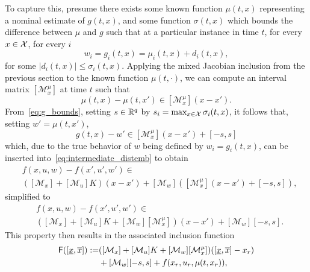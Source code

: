 \documentclass{IEEEojcsys}
\begin{document}
To capture this, presume there exists some known function $\mu(t, x)$ representing a nominal estimate of $g(t, x)$, and some function $\sigma(t, x)$ which bounds the difference between $\mu$ and $g$ such that at a particular instance in time $t$, for every $x\in \mathcal{X}$, for every $i$
\begin{equation}
    w_i = g_i(t,x) = \mu_i(t,x) + d_i(t,x),
    \label{eq:g_bounds}
\end{equation}
for some $|d_i(t,x)| \leq \sigma_i(t,x)$.
Applying the mixed Jacobian inclusion from the previous section to the known function $\mu(t,\cdot)$, we can compute an interval matrix $[\mathcal{M}_x^\mu]$ at time $t$ such that
\begin{equation}
    \mu(t, x) - \mu(t, x') \in [\mathcal{M}_x^\mu](x - x').
\end{equation}
From~\eqref{eq:g_bounds}, setting $s\in\mathbb{R}^q$ by $s_i = \max_{x\in\mathcal{X}} \sigma_i(t,x)$, it follows that, setting $w' = \mu(t,x')$,
\begin{equation}
    g(t, x) - w' \in [\mathcal{M}_x^\mu](x - x') + [-s,s]  %
\end{equation}
which, due to the true behavior of $w$ being defined by $w_i = g_i(t, x)$, can be inserted into~\eqref{eq:intermediate_distemb} to obtain
\begin{align}
    &f(x, u, w) - f(x', u', w') \in \label{eq:almost_final_algeb}\\ &([\mathcal{M}_x] + [\mathcal{M}_u]K)(x - x') + [\mathcal{M}_w]([\mathcal{M}^\mu_x](x - x') + [-s,s]), \nonumber
\end{align}
simplified to
\begin{align}
    &f(x, u, w) - f(x', u', w') \in \label{eq:final_algeb}\\ &([\mathcal{M}_x] + [\mathcal{M}_u]K + [\mathcal{M}_w][\mathcal{M}^\mu_x])(x - x') + [\mathcal{M}_w][-s,s]. \nonumber
\end{align}
This property then results in the associated inclusion function %
\begin{align}
    \sfF([\ulx,\olx]) := &([\mathcal{M}_x] + [\mathcal{M}_u]K + [\mathcal{M}_w][\mathcal{M}^\mu_x])([\ulx,\olx] - x_r) \nonumber  \\
    &+ [\mathcal{M}_w][-s,s] + f(x_r, u_r, \mu(t, x_r)),  \label{eq:final_theoretical_inc}
\end{align}
\end{document}
